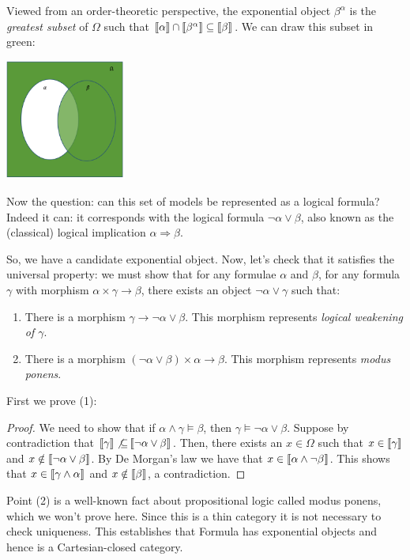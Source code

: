 Viewed from an order-theoretic perspective, the exponential object
$\beta^\alpha$ is the \emph{greatest subset} of $\Omega$ such that
$\left\llbracket \alpha \right\rrbracket \cap \left\llbracket \beta^\alpha \right\rrbracket \subseteq \left\llbracket \beta \right\rrbracket$. 
We can draw this subset in green:
\begin{center}
  \includegraphics[width=150px]{fig/venn-impl.png}
\end{center}

Now the question: can
this set of models be represented as a logical formula? Indeed it can:
it corresponds with the logical formula $\neg \alpha \lor \beta$, 
also known as the (classical) logical implication $\alpha \Rightarrow \beta$.

So, we have a candidate exponential object. Now, let's check that it 
satisfies the universal property: we 
must show that for any formulae $\alpha$ and $\beta$, 
for any formula $\gamma$ with morphism $\alpha \times \gamma \to \beta$, 
there exists an object $\neg \alpha \lor \gamma$ such that:
\begin{enumerate}
  \item There is a morphism $\gamma \to \neg \alpha \lor \beta$. This morphism represents \emph{logical weakening of $\gamma$}.
  \item There is a morphism $(\neg \alpha \lor \beta) \times \alpha \to \beta$. 
  This morphism represents \emph{modus ponens}.
\end{enumerate}
First we prove (1):
\begin{proof}
  We need to show that if $\alpha \land \gamma \models \beta$, then 
  $\gamma \models \neg \alpha \lor \beta$.
  Suppose by contradiction that $\left\llbracket \gamma \right\rrbracket \not{\subseteq} \left\llbracket \neg \alpha \lor \beta \right\rrbracket$.
  Then, there exists an $x \in \Omega$ such that $x \in \left\llbracket \gamma \right\rrbracket$
  and $x \notin \left\llbracket \neg \alpha \lor \beta \right\rrbracket$. 
  By De Morgan's law we have that $x \in \left\llbracket \alpha \land \neg \beta \right\rrbracket$. 
  This shows that $x \in \left\llbracket \gamma \land \alpha \right\rrbracket$ and $x \notin \left\llbracket \beta \right\rrbracket$, 
  a contradiction.
\end{proof}

Point (2) is a well-known fact about propositional logic called 
modus ponens, which we won't prove here.
Since this is a thin category it is not necessary to check uniqueness.
This establishes that \textsf{Formula} has exponential objects and 
hence is a Cartesian-closed category.

